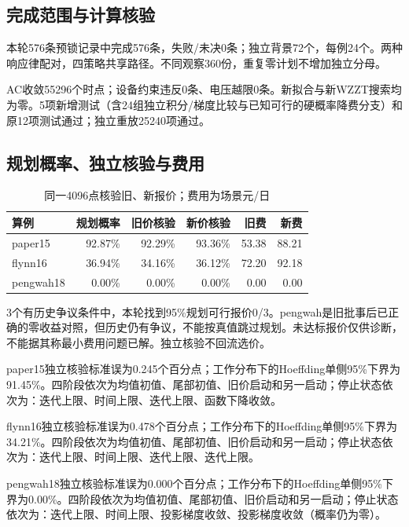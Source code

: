 \subsection{完成范围与计算核验}

本轮576条预锁记录中完成576条，失败/未决0条；独立背景72个，每例24个。两种响应律配对，四策略共享路径。不同观察360份，重复零计划不增加独立分母。

AC收敛55296个时点；设备约束违反0条、电压越限0条。新拟合与新WZZT搜索均为零。5项新增测试（含24组独立积分/梯度比较与已知可行的硬概率降费分支）和原12项测试通过；独立重放25240项通过。

\subsection{规划概率、独立核验与费用}

\begin{table}[ht]\centering\small\caption{同一4096点核验旧、新报价；费用为场景元/日}

\begin{tabular}{lrrrrr}\toprule 算例&规划概率&旧价核验&新价核验&旧费&新费\\\midrule

paper15&92.87\%&92.29\%&93.36\%&53.38&88.21\\

flynn16&36.94\%&34.16\%&36.12\%&72.20&92.18\\

pengwah18&0.00\%&0.00\%&0.00\%&0.00&0.00\\

\bottomrule\end{tabular}\end{table}

3个有历史争议条件中，本轮找到95\%规划可行报价0/3。pengwah是旧批事后已正确的零收益对照，但历史仍有争议，不能按真值跳过规划。未达标报价仅供诊断，不能据其称最小费用问题已解。独立核验不回流选价。

paper15独立核验标准误为0.245个百分点；工作分布下的Hoeffding单侧95\%下界为91.45\%。四阶段依次为均值初值、尾部初值、旧价启动和另一启动；停止状态依次为：迭代上限、时间上限、迭代上限、函数下降收敛。

flynn16独立核验标准误为0.478个百分点；工作分布下的Hoeffding单侧95\%下界为34.21\%。四阶段依次为均值初值、尾部初值、旧价启动和另一启动；停止状态依次为：迭代上限、时间上限、迭代上限、迭代上限。

pengwah18独立核验标准误为0.000个百分点；工作分布下的Hoeffding单侧95\%下界为0.00\%。四阶段依次为均值初值、尾部初值、旧价启动和另一启动；停止状态依次为：迭代上限、时间上限、投影梯度收敛、投影梯度收敛（概率仍为零）。


